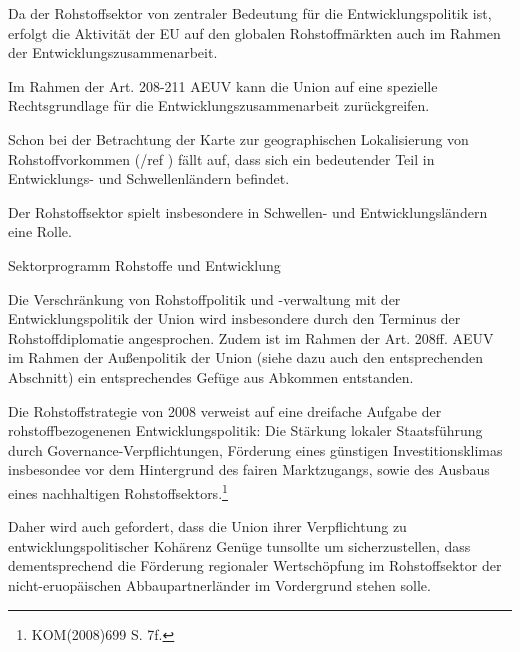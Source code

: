 \documentclass[12pt,a4paper,oneside]{book} %
\begin{document}
Da der Rohstoffsektor von zentraler Bedeutung für die Entwicklungspolitik ist, erfolgt die Aktivität der EU auf den globalen Rohstoffmärkten auch im Rahmen der Entwicklungszusammenarbeit.\autocite{Schorkopf, Rn. 53}



Im Rahmen der Art. 208-211 AEUV kann die Union auf eine spezielle Rechtsgrundlage für die Entwicklungszusammenarbeit zurückgreifen.

Schon bei der Betrachtung der Karte zur geographischen Lokalisierung von Rohstoffvorkommen (/ref ) fällt auf, dass sich ein bedeutender Teil in Entwicklungs- und Schwellenländern befindet.

Der Rohstoffsektor spielt insbesondere in Schwellen- und Entwicklungsländern eine Rolle.

Sektorprogramm Rohstoffe und Entwicklung

Die Verschränkung von Rohstoffpolitik und -verwaltung mit der Entwicklungspolitik der Union wird insbesondere durch den Terminus der Rohstoffdiplomatie angesprochen. Zudem ist im Rahmen der Art. 208ff. AEUV im Rahmen der Außenpolitik der Union (siehe dazu auch den entsprechenden Abschnitt) ein entsprechendes Gefüge aus Abkommen entstanden.

Die Rohstoffstrategie von 2008 verweist auf eine dreifache Aufgabe der rohstoffbezogenenen Entwicklungspolitik: Die Stärkung lokaler Staatsführung durch Governance-Verpflichtungen, Förderung eines günstigen Investitionsklimas insbesondee vor dem Hintergrund des fairen Marktzugangs, sowie des Ausbaus eines nachhaltigen Rohstoffsektors.\footnote{KOM(2008)699 S. 7f.}

Daher wird auch gefordert, dass die Union \glqq ihrer Verpflichtung zu entwicklungspolitischer Kohärenz Genüge tun\grqq sollte um sicherzustellen, dass dementsprechend die Förderung regionaler Wertschöpfung im Rohstoffsektor der nicht-eruopäischen Abbaupartnerländer im Vordergrund stehen solle.\autocite[15]{Kueblboeck_2023}
\end{document}
